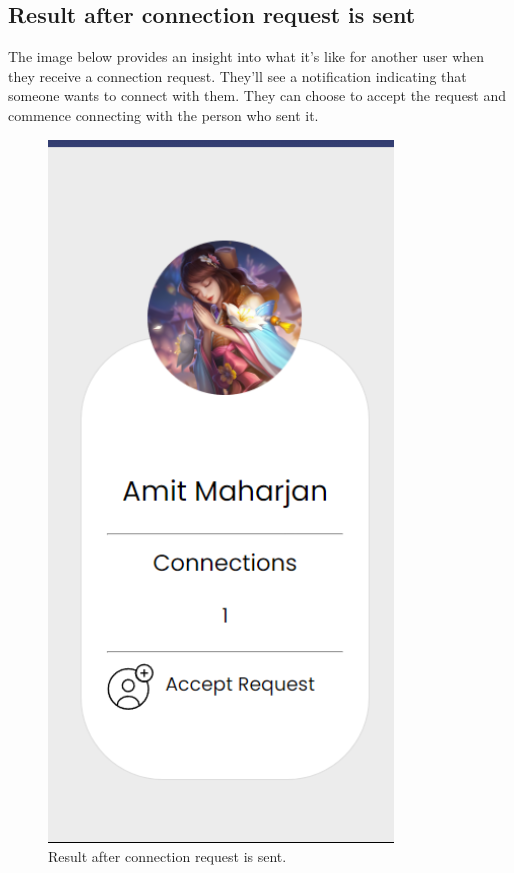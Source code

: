 \subsection{Result after connection request is sent}
The image below provides an insight into what it's like for another user when they receive a connection request. They'll see a notification indicating that someone wants to connect with them. They can choose to accept the request and commence connecting with the person who sent it. 
\begin{figure}[H]
    \centering
    \includegraphics[height=0.3\textheight]{Outcome-ss/accept-request.png}
    \caption{Result after connection request is sent.}
    \label{fig:Result after connection request is sent}
\end{figure}

\newpage
